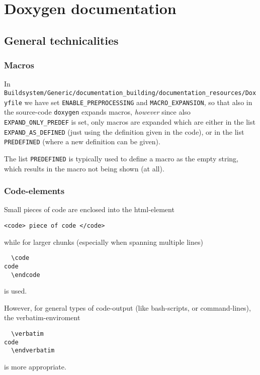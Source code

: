 \documentclass{book}
\newcommand{\filename}[1]{\texttt{#1}}
\begin{document}
\chapter{Doxygen documentation}
\label{cha:Doxygen}


\section{General technicalities}
\label{sec:DoxygenGeneraltechnicalities}

\subsection{Macros}
\label{sec:DoxygenGeneraltechnicalitiesMacros}

In \filename{Buildsystem/Generic/documentation\_building/documentation\_resources/Doxyfile} we have set \texttt{ENABLE\_PREPROCESSING} and \texttt{MACRO\_EXPANSION}, so that also in the source-code \texttt{doxygen} expands macros, \emph{however} since also \texttt{EXPAND\_ONLY\_PREDEF} is set, only macros are expanded which are either in the list \texttt{EXPAND\_AS\_DEFINED} (just using the definition given in the code), or in the list \texttt{PREDEFINED} (where a new definition can be given).

The list \texttt{PREDEFINED} is typically used to define a macro as the empty string, which results in the macro not being shown (at all).



\subsection{Code-elements}
\label{sec:DoxygenGeneraltechnicalitiesCodeelements}

Small pieces of code are enclosed into the html-element
\begin{verbatim}
<code> piece of code </code>
\end{verbatim}
while for larger chunks (especially when spanning multiple lines)
\begin{verbatim}
  \code 
code 
  \endcode
\end{verbatim}
is used.

However, for general types of code-output (like bash-scripts, or command-lines), the verbatim-enviroment
\begin{verbatim}
  \verbatim 
code 
  \endverbatim
\end{verbatim}
is more appropriate.
\end{document}
